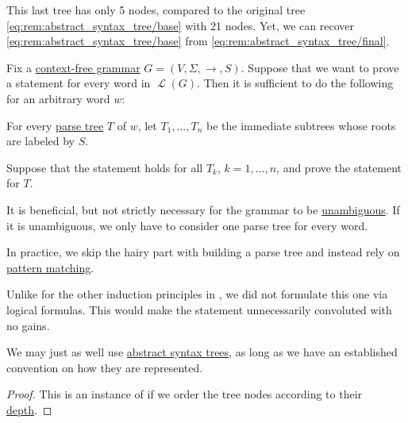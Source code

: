 \begin{remark}
  This last tree has only 5 nodes, compared to the original tree \eqref{eq:rem:abstract_syntax_tree/base} with 21 nodes. Yet, we can recover \eqref{eq:rem:abstract_syntax_tree/base} from \eqref{eq:rem:abstract_syntax_tree/final}.
\end{remark}

\begin{theorem}\label{thm:induction_on_syntax_trees}
  Fix a \hyperref[def:chomsky_hierarchy/context_free]{context-free grammar} \( G = (V, \Sigma, \to, S) \). Suppose that we want to prove a statement for every word in \( \mscrL(G) \). Then it is sufficient to do the following for an arbitrary word \( w \):
  \begin{displayquote}
    For every \hyperref[def:parse_tree]{parse tree} \( T \) of \( w \), let \( T_1, \ldots, T_n \) be the immediate subtrees whose roots are labeled by \( S \).

    Suppose that the statement holds for all \( T_k \), \( k = 1, \ldots, n \), and prove the statement for \( T \).
  \end{displayquote}
\end{theorem}
\begin{comments}
  \item It is beneficial, but not strictly necessary for the grammar to be \hyperref[def:grammar_ambiguity]{unambiguous}. If it is unambiguous, we only have to consider one parse tree for every word.
  \item In practice, we skip the hairy part with building a parse tree and instead rely on \hyperref[rem:evaluation]{pattern matching}.
  \item Unlike for the other induction principles in , we did not formulate this one via logical formulas. This would make the statement unnecessarily convoluted with no gains.
  \item We may just as well use \hyperref[rem:abstract_syntax_tree]{abstract syntax trees}, as long as we have an established convention on how they are represented.
\end{comments}
\begin{proof}
  This is an instance of  if we order the tree nodes according to their \hyperref[def:rooted_tree/depth]{depth}.
\end{proof}

